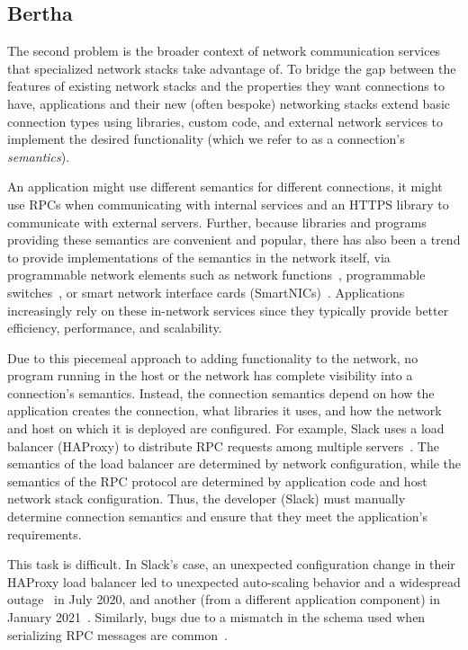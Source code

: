 \documentclass[fontsize=12pt,paper=letter]{scrartcl}
\begin{document}
\subsection{Bertha}
The second problem is the broader context of network communication services that specialized network stacks take advantage of.
To bridge the gap between the features of existing network stacks and the properties they want connections to have, applications and their new (often bespoke) networking stacks extend basic connection types using libraries, custom code, and external network services to implement the desired functionality (which we refer to as a connection's \emph{semantics}). 

An application might use different semantics for different connections, \eg it might use RPCs when communicating with internal services and an HTTPS library to communicate with external servers. 
Further, because libraries and programs providing these semantics are convenient and popular, there has also been a trend to provide implementations of the semantics in the network itself, \eg via programmable network elements such as network functions~\cite{amazon-alb, nfv}, programmable switches~\cite{domino, mom, netcache, cheetah}, or smart network interface cards (SmartNICs)~\cite{toe-chelsio, floem}. 
Applications increasingly rely on these in-network services since they typically provide better efficiency, performance, and scalability.

Due to this piecemeal approach to adding functionality to the network, 
no program running in the host or the network has complete visibility into a connection's semantics. Instead, the connection semantics depend on how the application creates the connection, what libraries it uses, and how the network and host on which it is deployed are configured. 
For example, Slack uses a load balancer (HAProxy) to distribute RPC requests among multiple servers~\cite{slack:outage}. 
The semantics of the load balancer are determined by network configuration, while the semantics of the RPC protocol are determined by application code and host network stack configuration. 
Thus, the developer (Slack) must manually determine connection semantics and ensure that they meet the application's requirements.

This task is difficult. In Slack's case, an unexpected configuration change in their HAProxy load balancer led to unexpected auto-scaling behavior and a widespread outage~\cite{slack:outage} in July 2020, and another (from a different application component) in January 2021~\cite{slack:outage2}. 
Similarly, bugs due to a mismatch in the schema used when serializing RPC messages are common~\cite{tableau-bug, aws-db-migration-bug, cassandra-schema-version-bug}. 
\end{document}
